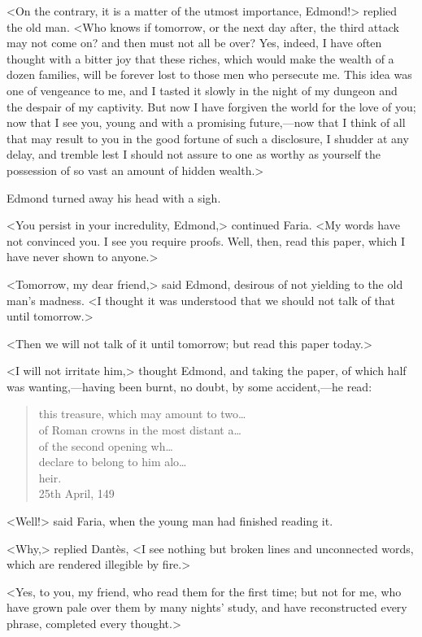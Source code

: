  <On the contrary, it is a matter of the utmost importance, Edmond!> replied the old man. <Who knows if tomorrow, or the next day after, the third attack may not come on? and then must not all be over? Yes, indeed, I have often thought with a bitter joy that these riches, which would make the wealth of a dozen families, will be forever lost to those men who persecute me. This idea was one of vengeance to me, and I tasted it slowly in the night of my dungeon and the despair of my captivity. But now I have forgiven the world for the love of you; now that I see you, young and with a promising future,—now that I think of all that may result to you in the good fortune of such a disclosure, I shudder at any delay, and tremble lest I should not assure to one as worthy as yourself the possession of so vast an amount of hidden wealth.> 

 Edmond turned away his head with a sigh. 

 <You persist in your incredulity, Edmond,> continued Faria. <My words have not convinced you. I see you require proofs. Well, then, read this paper, which I have never shown to anyone.> 

 <Tomorrow, my dear friend,> said Edmond, desirous of not yielding to the old man's madness. <I thought it was understood that we should not talk of that until tomorrow.> 

 <Then we will not talk of it until tomorrow; but read this paper today.> 

 <I will not irritate him,> thought Edmond, and taking the paper, of which half was wanting,—having been burnt, no doubt, by some accident,—he read:  
 
 \begin{quote}\oldfont
 this treasure, which may amount to two\dots \\ of Roman crowns in the most distant a\dots \\ of the second opening wh\dots \\ declare to belong to him alo\dots \\ heir.\\25th April, 149
 \end{quote}

 <Well!> said Faria, when the young man had finished reading it. 

 <Why,> replied Dantès, <I see nothing but broken lines and unconnected words, which are rendered illegible by fire.> 

 <Yes, to you, my friend, who read them for the first time; but not for me, who have grown pale over them by many nights' study, and have reconstructed every phrase, completed every thought.> 

